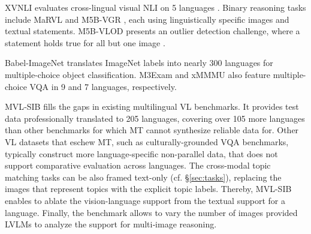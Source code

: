 XVNLI evaluates cross-lingual visual NLI on 5 languages \cite{bugliarello-etal-2022-iglue}. Binary reasoning tasks include MaRVL \cite{liu-etal-2021-visually} and M5B-VGR \cite{schneider-sitaram-2024-m5}, each using linguistically specific images and textual statements. M5B-VLOD presents an outlier detection challenge, where a statement holds true for all but one image \cite{schneider-sitaram-2024-m5}.

Babel-ImageNet \cite{geigle-etal-2024-babel} translates ImageNet labels into nearly 300 languages for multiple-choice object classification.  M3Exam and xMMMU also feature multiple-choice VQA in 9 and 7 languages, respectively.

\vspace{1.2mm}
\noindent MVL‐SIB fills the gaps in existing multilingual VL benchmarks. It provides test data professionally translated to 205 languages, covering over 105 more languages than other benchmarks for which MT cannot synthesize reliable data for. Other VL datasets that eschew MT, such as culturally-grounded VQA benchmarks,  typically construct more language-specific non-parallel data, that does not support comparative evaluation across languages. The cross-modal topic matching tasks can be also framed text-only (cf. \S\ref{sec:tasks}), replacing the images that represent topics with the explicit topic labels. Thereby, MVL-SIB enables to ablate the vision-language support from the textual support for a language. Finally, the benchmark allows to vary the number of images provided LVLMs to analyze the support for multi‐image reasoning.

